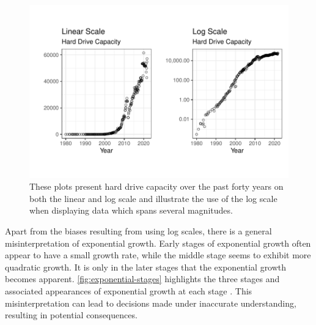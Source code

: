 \documentclass[12pt]{article}
\begin{document}
\begin{figure}[tbp]

{\centering \includegraphics[width=1\linewidth,]{logarithmic-lineups-revisions_files/figure-latex/log-scales-1} 

}

\caption[Linear scale versus log scale]{These plots present hard drive capacity over the past forty years on both the linear and log scale and illustrate the use of the log scale when displaying data which spans several magnitudes.}\label{fig:log-scales}
\end{figure}

Apart from the biases resulting from using log scales, there is a
general misinterpretation of exponential growth. Early stages of
exponential growth often appear to have a small growth rate, while the
middle stage seems to exhibit more quadratic growth. It is only in the
later stages that the exponential growth becomes apparent.
\cref{fig:exponential-stages} highlights the three stages and associated
appearances of exponential growth at each stage
\citep{vonbergmann_2021}. This misinterpretation can lead to decisions
made under inaccurate understanding, resulting in potential
consequences.
\end{document}
